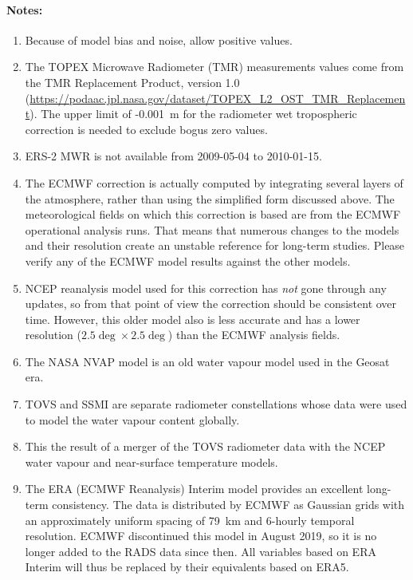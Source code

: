 \documentclass[a4paper,11pt,openany,natbib,nomargin]{thesis}
\newenvironment{notes}[1][Notes:]{\FloatBarrier\paragraph{#1}\begin{enumerate}}{\end{enumerate}}
\begin{document}
\begin{notes}
\item Because of model bias and noise, allow positive values.\label{item:wet_tropo_rad_n1}
\item The TOPEX Microwave Radiometer (TMR) measurements values come from the TMR Replacement Product, version 1.0 (\url{https://podaac.jpl.nasa.gov/dataset/TOPEX_L2_OST_TMR_Replacement}). The upper limit of -0.001~m for the radiometer wet tropospheric correction is needed to exclude bogus zero values.\label{item:wet_tropo_rad_tp}
\item ERS-2 MWR is not available from 2009-05-04 to 2010-01-15.\label{item:wet_tropo_rad_e2}
\item The ECMWF correction is actually computed by integrating several layers of the atmosphere, rather than using the simplified form discussed above. The meteorological fields on which this correction is based are from the ECMWF operational analysis runs. That means that numerous changes to the models and their resolution create an unstable reference for long-term studies. Please verify any of the ECMWF model results against the other models.\label{item:wet_tropo_ecmwf}
\item NCEP reanalysis model used for this correction has \emph{not} gone through any updates, so from that point of view the correction should be consistent over time. However, this older model also is less accurate and has a lower resolution ($2.5\deg\times2.5\deg$) than the ECMWF analysis fields.\label{item:wet_tropo_ncep}
\item The NASA NVAP model is an old water vapour model used in the Geosat era.\label{item:wet_tropo_nvap}
\item TOVS and SSMI are separate radiometer constellations whose data were used to model the water vapour content globally.\label{item:wet_tropo_tovs_ssmi}
\item This the result of a merger of the TOVS radiometer data with the NCEP water vapour and near-surface temperature models.\label{item:wet_tropo_tovs_ncep}
\item The ERA (ECMWF Reanalysis) Interim model provides an excellent long-term consistency. The data is distributed by ECMWF as Gaussian grids with an approximately uniform spacing of 79~km and 6-hourly temporal resolution\citep{berrisford2011}. ECMWF discontinued this model in August 2019, so it is no longer added to the RADS data since then. All variables based on ERA Interim will thus be replaced by their equivalents based on ERA5.\label{item:wet_tropo_era}

\end{notes}
\end{document}
